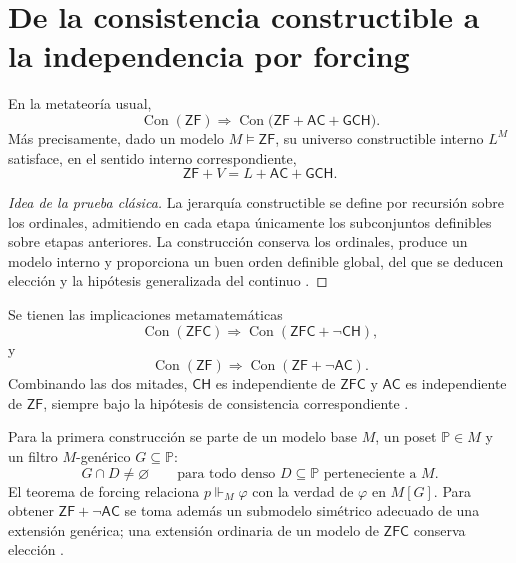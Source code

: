 \label{chap:p3-83-47-godel_cohen}

\section{De la consistencia constructible a la independencia por forcing}

\begin{theorem}
En la metateoría usual,
\[
  \operatorname{Con}(\mathsf{ZF})
  \Longrightarrow
  \operatorname{Con}
  \bigl(\mathsf{ZF}+\mathsf{AC}+\mathsf{GCH}\bigr).
\]
Más precisamente, dado un modelo \(M\models\mathsf{ZF}\), su universo
constructible interno \(L^M\) satisface, en el sentido interno correspondiente,
\[
  \mathsf{ZF}+V=L+\mathsf{AC}+\mathsf{GCH}.
\]
\end{theorem}

\begin{proof}[Idea de la prueba clásica]
La jerarquía constructible se define por recursión sobre los ordinales,
admitiendo en cada etapa únicamente los subconjuntos definibles sobre etapas
anteriores. La construcción conserva los ordinales, produce un modelo interno
y proporciona un buen orden definible global, del que se deducen elección y
la hipótesis generalizada del continuo \citep{goedel1940}.
\end{proof}

\begin{theorem}
Se tienen las implicaciones metamatemáticas
\[
  \operatorname{Con}(\mathsf{ZFC})
  \Longrightarrow
  \operatorname{Con}(\mathsf{ZFC}+\neg\mathsf{CH}),
\]
y
\[
  \operatorname{Con}(\mathsf{ZF})
  \Longrightarrow
  \operatorname{Con}(\mathsf{ZF}+\neg\mathsf{AC}).
\]
Combinando las dos mitades, \(\mathsf{CH}\) es independiente de
\(\mathsf{ZFC}\) y \(\mathsf{AC}\) es independiente de \(\mathsf{ZF}\),
siempre bajo la hipótesis de consistencia correspondiente
\citep{cohen1963,cohen1964}.
\end{theorem}

Para la primera construcción se parte de un modelo base \(M\), un poset
\(\mathbb P\in M\) y un filtro \(M\)-genérico \(G\subseteq\mathbb P\):
\[
  G\cap D\ne\varnothing
  \qquad
  \text{para todo denso }D\subseteq\mathbb P\text{ perteneciente a }M.
\]
El teorema de forcing relaciona \(p\Vdash_M\varphi\) con la verdad de
\(\varphi\) en \(M[G]\). Para obtener
\(\mathsf{ZF}+\neg\mathsf{AC}\) se toma además un submodelo simétrico
adecuado de una extensión genérica; una extensión ordinaria de un modelo de
\(\mathsf{ZFC}\) conserva elección \citep{cohen1966}.

